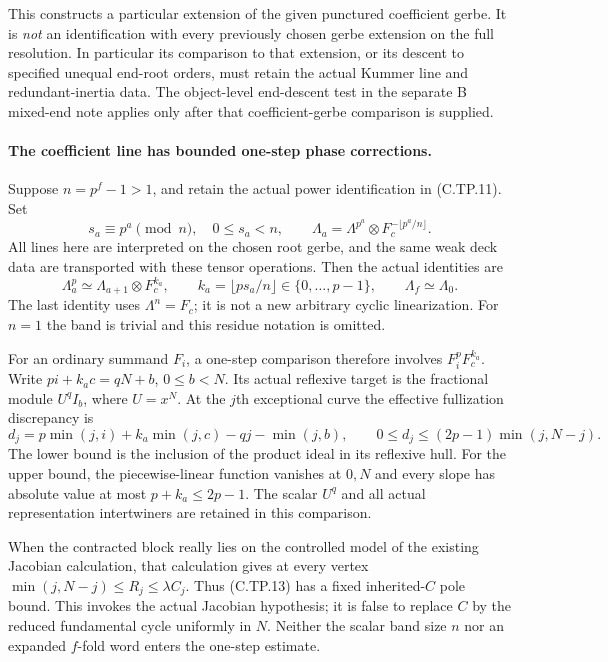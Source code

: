 This constructs a particular extension of the given punctured
coefficient gerbe.  It is \emph{not} an identification with every
previously chosen gerbe extension on the full resolution.  In
particular its comparison to that extension, or its descent to
specified unequal end-root orders, must retain the actual Kummer
line and redundant-inertia data.  The object-level end-descent
test in the separate B mixed-end note applies only after that
coefficient-gerbe comparison is supplied.

\paragraph{The coefficient line has bounded one-step phase corrections.}
Suppose $n=p^f-1>1$, and retain the actual power identification
in (C.TP.11).  Set
\[
 s_a\equiv p^a\pmod n,\quad 0\le s_a<n,\qquad
 \Lambda_a=\Lambda^{p^a}\otimes
                  F_c^{-\lfloor p^a/n\rfloor}.
\]
All lines here are interpreted on the chosen root gerbe, and the
same weak deck data are transported with these tensor operations.
Then the actual identities are
\[
 \Lambda_a^p\simeq\Lambda_{a+1}\otimes F_c^{k_a},
 \qquad k_a=\lfloor ps_a/n\rfloor\in\{0,\ldots,p-1\},
 \qquad \Lambda_f\simeq\Lambda_0.                    \tag{C.TP.12}
\]
The last identity uses $\Lambda^n=F_c$; it is not a new arbitrary
cyclic linearization.  For $n=1$ the band is trivial and this residue
notation is omitted.

For an ordinary summand $F_i$, a one-step comparison therefore
involves $F_i^pF_c^{k_a}$.  Write $pi+k_ac=qN+b$, $0\le b<N$.
Its actual reflexive target is the fractional module $U^qI_b$,
where $U=x^N$.  At the $j$th exceptional curve the effective
fullization discrepancy is
\[
 d_j=p\min(j,i)+k_a\min(j,c)-qj-\min(j,b),
 \qquad 0\le d_j\le(2p-1)\min(j,N-j).                \tag{C.TP.13}
\]
The lower bound is the inclusion of the product ideal in its
reflexive hull.  For the upper bound, the piecewise-linear function
vanishes at $0,N$ and every slope has absolute value at most
$p+k_a\le2p-1$.  The scalar $U^q$ and all actual representation
intertwiners are retained in this comparison.

When the contracted block really lies on the controlled model of
the existing Jacobian calculation, that calculation gives at every
vertex $\min(j,N-j)\le R_j\le\lambda C_j$.
Thus (C.TP.13) has a fixed inherited-$C$ pole bound.  This invokes
the actual Jacobian hypothesis; it is false to replace $C$ by the
reduced fundamental cycle uniformly in $N$.  Neither the scalar
band size $n$ nor an expanded $f$-fold word enters the one-step
estimate.

